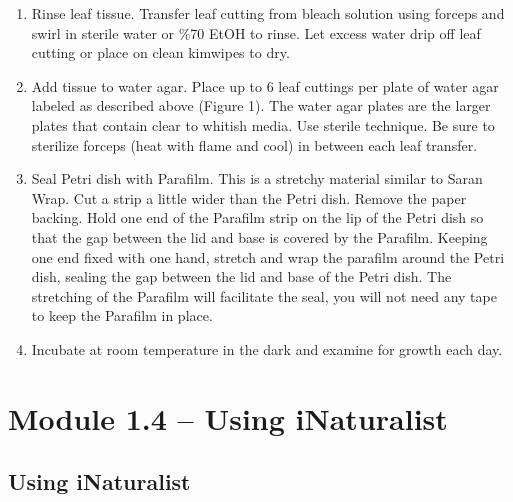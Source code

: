 \documentclass[
  letterpaper,
  DIV=11,
  numbers=noendperiod]{scrreprt}
\providecommand{\tightlist}{%
  \setlength{\itemsep}{0pt}\setlength{\parskip}{0pt}}
\begin{document}
\begin{enumerate}
  \begin{enumerate}
  \def\labelenumii{\alph{enumii}.}
  \tightlist
  \item
    To prepare the bleach solution, sterilize water by boiling water for
    10 minutes. You will need enough water for the bleach solution and
    rinse step. Distilled water is preferred. If unavailable, use tap
    water. Let water cool to room temperature before coming into contact
    with plant tissue.
  \item
    Mix 1ml (1/4 teaspoon) household bleach with 500 ml (2 cups)
    sterilized water.
  \end{enumerate}
\item
  Rinse leaf tissue. Transfer leaf cutting from bleach solution using
  forceps and swirl in sterile water or \%70 EtOH to rinse. Let excess
  water drip off leaf cutting or place on clean kimwipes to dry.
\item
  Add tissue to water agar. Place up to 6 leaf cuttings per plate of
  water agar labeled as described above (Figure 1). The water agar
  plates are the larger plates that contain clear to whitish media. Use
  sterile technique. Be sure to sterilize forceps (heat with flame and
  cool) in between each leaf transfer.
\item
  Seal Petri dish with Parafilm. This is a stretchy material similar to
  Saran Wrap. Cut a strip a little wider than the Petri dish. Remove the
  paper backing. Hold one end of the Parafilm strip on the lip of the
  Petri dish so that the gap between the lid and base is covered by the
  Parafilm. Keeping one end fixed with one hand, stretch and wrap the
  parafilm around the Petri dish, sealing the gap between the lid and
  base of the Petri dish. The stretching of the Parafilm will facilitate
  the seal, you will not need any tape to keep the Parafilm in place.
\item
  Incubate at room temperature in the dark and examine for growth each
  day.
\end{enumerate}

\section*{Module 1.4 -- Using
iNaturalist}\label{module-1.4-using-inaturalist}


\subsection*{Using iNaturalist}\label{using-inaturalist}
\end{document}
